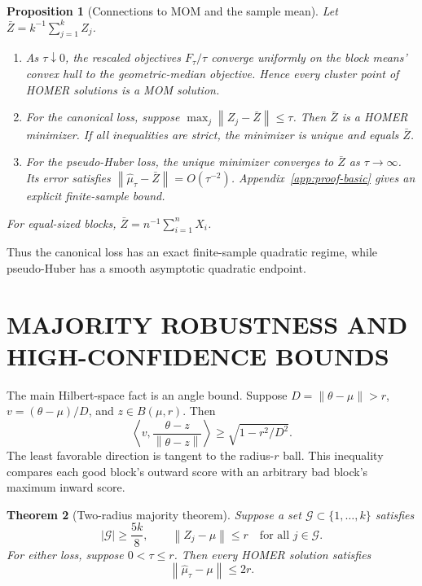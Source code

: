 \documentclass[twoside]{article}
\newtheorem{theorem}{Theorem}
\newtheorem{proposition}[theorem]{Proposition}
\theoremstyle{definition}
\newcommand{\norm}[1]{\left\lVert #1\right\rVert}
\begin{document}
\begin{proposition}[Connections to MOM and the sample mean]\label{prop:endpoints}
Let $\bar Z=k^{-1}\sum_{j=1}^k Z_j$.
\begin{enumerate}[label=(\roman*),leftmargin=*]
    \item As $\tau\downarrow0$, the rescaled objectives $F_\tau/\tau$ converge uniformly on the block means' convex hull to the geometric-median objective. Hence every cluster point of HOMER solutions is a MOM solution.
    \item For the canonical loss, suppose $\max_j\norm{Z_j-\bar Z}\le\tau$. Then $\bar Z$ is a HOMER minimizer. If all inequalities are strict, the minimizer is unique and equals $\bar Z$.
    \item For the pseudo-Huber loss, the unique minimizer converges to $\bar Z$ as $\tau\to\infty$. Its error satisfies $\norm{\hat\mu_\tau-\bar Z}=O(\tau^{-2})$. Appendix~\ref{app:proof-basic} gives an explicit finite-sample bound.
\end{enumerate}
For equal-sized blocks, $\bar Z=n^{-1}\sum_{i=1}^nX_i$.
\end{proposition}

Thus the canonical loss has an exact finite-sample quadratic regime, while pseudo-Huber has a smooth asymptotic quadratic endpoint.


\section{MAJORITY ROBUSTNESS AND HIGH-CONFIDENCE BOUNDS}

The main Hilbert-space fact is an angle bound. Suppose $D=\norm{\theta-\mu}>r$, $v=(\theta-\mu)/D$, and $z\in B(\mu,r)$. Then
\begin{equation}\label{eq:angle-bound}
    \left\langle v,\frac{\theta-z}{\norm{\theta-z}}\right\rangle
    \ge \sqrt{1-r^2/D^2}.
\end{equation}
The least favorable direction is tangent to the radius-$r$ ball. This inequality compares each good block's outward score with an arbitrary bad block's maximum inward score.

\begin{theorem}[Two-radius majority theorem]\label{thm:deterministic}
Suppose a set $\mathcal G\subset\{1,\ldots,k\}$ satisfies
\begin{equation*}
    |\mathcal G|\ge \frac{5k}{8},
    \qquad
    \norm{Z_j-\mu}\le r\quad\text{for all }j\in\mathcal G.
\end{equation*}
For either loss, suppose $0<\tau\le r$. Then every HOMER solution satisfies
\begin{equation*}
    \norm{\hat\mu_\tau-\mu}\le2r.
\end{equation*}
\end{theorem}
\end{document}
